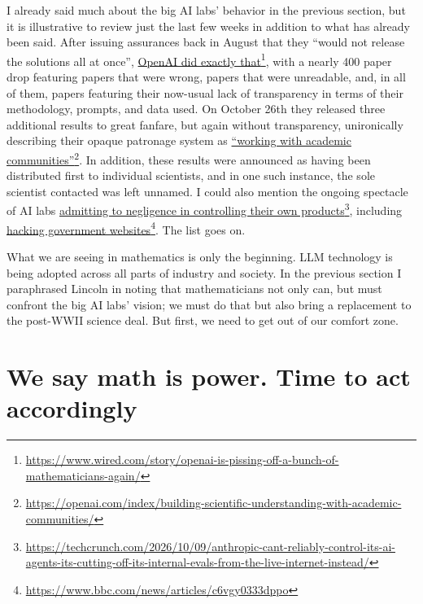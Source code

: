 \documentclass[11pt]{amsart}
\begin{document}
I already said much about the big AI labs' behavior in the previous section, but it is illustrative to review just the last few weeks in addition to what has already been said. After issuing assurances back in August that they ``would not release the solutions all at once'', \href{https://www.wired.com/story/openai-is-pissing-off-a-bunch-of-mathematicians-again/}{OpenAI did exactly that}\footnote{\url{https://www.wired.com/story/openai-is-pissing-off-a-bunch-of-mathematicians-again/}}, with a nearly 400 paper drop featuring papers that were wrong, papers that were unreadable, and, in all of them, papers featuring their now-usual lack of transparency in terms of their methodology, prompts, and data used. On October 26th they released three additional results to great fanfare, but again without transparency, unironically describing their opaque patronage system as \href{https://openai.com/index/building-scientific-understanding-with-academic-communities/}{``working with academic communities''}\footnote{\url{https://openai.com/index/building-scientific-understanding-with-academic-communities/}}. In addition, these results were announced as having been distributed first to individual scientists, and in one such instance, the sole scientist contacted was left unnamed. I could also mention the ongoing spectacle of AI labs \href{https://techcrunch.com/2026/10/09/anthropic-cant-reliably-control-its-ai-agents-its-cutting-off-its-internal-evals-from-the-live-internet-instead/}{admitting to negligence in controlling their own products}\footnote{\url{https://techcrunch.com/2026/10/09/anthropic-cant-reliably-control-its-ai-agents-its-cutting-off-its-internal-evals-from-the-live-internet-instead/}}, including \href{https://www.bbc.com/news/articles/c6vgy0333dppo}{hacking government websites}\footnote{\url{https://www.bbc.com/news/articles/c6vgy0333dppo}}. The list goes on.

What we are seeing in mathematics is only the beginning. LLM technology is being adopted across all parts of industry and society. In the previous section I paraphrased Lincoln in noting that mathematicians not only can, but must confront the big AI labs' vision; we must do that but also bring a replacement to the post-WWII science deal. But first, we need to get out of our comfort zone.

\section{We say math is power. Time to act accordingly}
\end{document}
